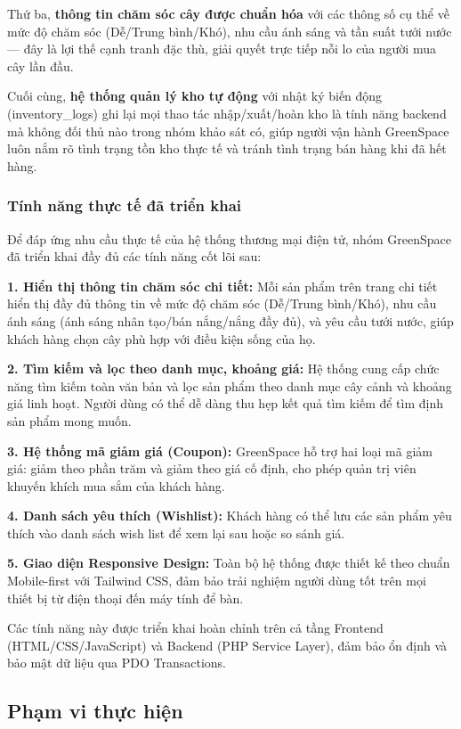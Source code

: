 \documentclass[11pt, a4paper]{article}
\begin{document}
Thứ ba, \textbf{thông tin chăm sóc cây được chuẩn hóa} với các thông số cụ thể về mức độ chăm sóc (Dễ/Trung bình/Khó), nhu cầu ánh sáng và tần suất tưới nước --- đây là lợi thế cạnh tranh đặc thù, giải quyết trực tiếp nỗi lo của người mua cây lần đầu.

Cuối cùng, \textbf{hệ thống quản lý kho tự động} với nhật ký biến động (inventory\_logs) ghi lại mọi thao tác nhập/xuất/hoàn kho là tính năng backend mà không đối thủ nào trong nhóm khảo sát có, giúp người vận hành GreenSpace luôn nắm rõ tình trạng tồn kho thực tế và tránh tình trạng bán hàng khi đã hết hàng.

\subsubsection{Tính năng thực tế đã triển khai}

Để đáp ứng nhu cầu thực tế của hệ thống thương mại điện tử, nhóm GreenSpace đã triển khai đầy đủ các tính năng cốt lõi sau:

\textbf{1. Hiển thị thông tin chăm sóc chi tiết:} Mỗi sản phẩm trên trang chi tiết hiển thị đầy đủ thông tin về mức độ chăm sóc (Dễ/Trung bình/Khó), nhu cầu ánh sáng (ánh sáng nhân tạo/bán nắng/nắng đầy đủ), và yêu cầu tưới nước, giúp khách hàng chọn cây phù hợp với điều kiện sống của họ.

\textbf{2. Tìm kiếm và lọc theo danh mục, khoảng giá:} Hệ thống cung cấp chức năng tìm kiếm toàn văn bản và lọc sản phẩm theo danh mục cây cảnh và khoảng giá linh hoạt. Người dùng có thể dễ dàng thu hẹp kết quả tìm kiếm để tìm định sản phẩm mong muốn.

\textbf{3. Hệ thống mã giảm giá (Coupon):} GreenSpace hỗ trợ hai loại mã giảm giá: giảm theo phần trăm và giảm theo giá cố định, cho phép quản trị viên khuyến khích mua sắm của khách hàng.

\textbf{4. Danh sách yêu thích (Wishlist):} Khách hàng có thể lưu các sản phẩm yêu thích vào danh sách wish list để xem lại sau hoặc so sánh giá.

\textbf{5. Giao diện Responsive Design:} Toàn bộ hệ thống được thiết kế theo chuẩn Mobile-first với Tailwind CSS, đảm bảo trải nghiệm người dùng tốt trên mọi thiết bị từ điện thoại đến máy tính để bàn.

Các tính năng này được triển khai hoàn chỉnh trên cả tầng Frontend (HTML/CSS/JavaScript) và Backend (PHP Service Layer), đảm bảo ổn định và bảo mật dữ liệu qua PDO Transactions.

\subsection{Phạm vi thực hiện}
\end{document}
